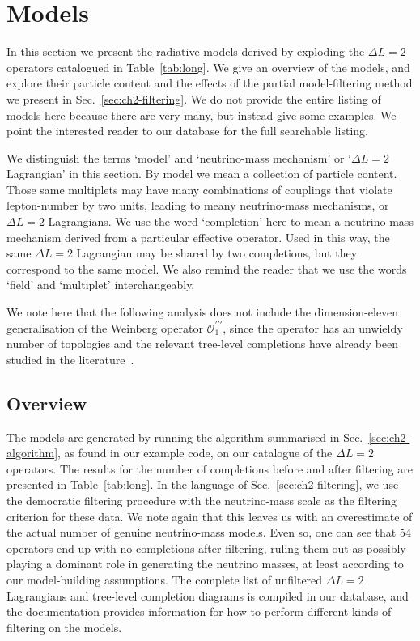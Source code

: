 \section{Models}
\label{sec:ch2-models}

In this section we present the radiative models derived by exploding the
$\Delta L = 2$ operators catalogued in Table~\ref{tab:long}. We give an overview
of the models, and explore their particle content and the effects of the partial
model-filtering method we present in Sec.~\ref{sec:ch2-filtering}. We do not provide
the entire listing of models here because there are very many, but instead give
some examples. We point the interested reader to our database for the full
searchable listing.

We distinguish the terms `model' and `neutrino-mass mechanism' or
`$\Delta L = 2$ Lagrangian' in this section. By model we mean a collection of
particle content. Those same multiplets may have many combinations of couplings
that violate lepton-number by two units, leading to meany neutrino-mass
mechanisms, or $\Delta L = 2$ Lagrangians. We use the word `completion' here to
mean a neutrino-mass mechanism derived from a particular effective operator.
Used in this way, the same $\Delta L = 2$ Lagrangian may be shared by two
completions, but they correspond to the same model. We also remind the reader
that we use the words `field' and `multiplet' interchangeably.

We note here that the following analysis does not include the dimension-eleven
generalisation of the Weinberg operator $\mathcal{O}_{1}^{\prime\prime\prime}$,
since the operator has an unwieldy number of topologies and the relevant
tree-level completions have already been studied in the
literature~\cite{Anamiati:2018cuq}.

\subsection{Overview}
\label{sec:ch2-modelsoverview}

The models are generated by running the algorithm summarised in
Sec.~\ref{sec:ch2-algorithm}, as found in our example code, on our catalogue of the
$\Delta L = 2$ operators. The results for the number of completions before and
after filtering are presented in Table~\ref{tab:long}. In the language of
Sec.~\ref{sec:ch2-filtering}, we use the democratic filtering procedure with the
neutrino-mass scale as the filtering criterion for these data. We note again
that this leaves us with an overestimate of the actual number of genuine
neutrino-mass models. Even so, one can see that 54 operators end up with no
completions after filtering, ruling them out as possibly playing a dominant role
in generating the neutrino masses, at least according to our model-building
assumptions. The complete list of unfiltered $\Delta L = 2$ Lagrangians and
tree-level completion diagrams is compiled in our database, and the
documentation provides information for how to perform different kinds of
filtering on the models.

